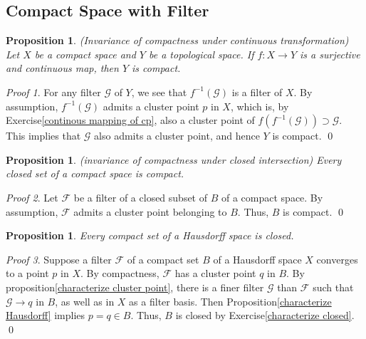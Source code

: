 \documentclass[a4paper,12pt]{article}
\newtheorem{prp}[thm]{Proposition}
\theoremstyle{remark}
\newtheorem*{prf}{Proof}
\theoremstyle{definition}
\theoremstyle{definition}
\theoremstyle{definition}
\begin{document}
\subsection{Compact Space with Filter}

\begin{prp}\label{invariance of compactness under ctn} (Invariance of compactness under continuous transformation)
	Let \( X \) be a compact space and \( Y \) be a topological space.
	If \( f:X \to Y \) is a surjective and continuous map, then \( Y \) is compact.
\end{prp}
\begin{prf}
	For any filter \( \mathscr{G} \) of \( Y \), we see that \( f^{-1}(\mathscr{G}) \) is a filter of \( X \). By assumption, \( f^{-1}(\mathscr{G}) \) admits a cluster point \( p \) in \( X \), which is, by Exercise\ref{continous mapping of cp}, also a cluster point of \( f(f^{-1}(\mathscr{G})) \supset \mathscr{G}\). This implies that \( \mathscr{G} \) also admits a cluster point, and hence \( Y \) is compact.
	\qed\end{prf}

\begin{prp}\label{invariance of compactness under closed intersection} (invariance of compactness under closed intersection)
	Every closed set of a compact space is compact.
\end{prp}
\begin{prf}
	Let \( \mathscr{F} \) be a filter of a closed subset of \( B \) of a compact space. By assumption, \( \mathscr{F} \) admits a cluster point belonging to \( B \). Thus, \( B \) is compact.
	\qed\end{prf}

\begin{prp}\label{compact -> closed if Hausdorff}
	Every compact set of a Hausdorff space is closed.
\end{prp}

\begin{prf}
	Suppose a filter \( \mathscr{F} \) of a compact set \( B \) of a Hausdorff space \( X \) converges to a point \( p \) in \( X \). By compactness, \( \mathscr{F} \) has a cluster point \( q \) in \( B \). By proposition\ref{characterize cluster point}, there is a finer filter \( \mathscr{G} \) than \( \mathscr{F} \) such that \( \mathscr{G} \to q \) in \( B \), as well as in \( X \) as a filter basis. Then Proposition\ref{characterize Hausdorff} implies \( p =q \in B \). Thus, \( B \) is closed by Exercise\ref{characterize closed}.
	\qed\end{prf}
\end{document}
